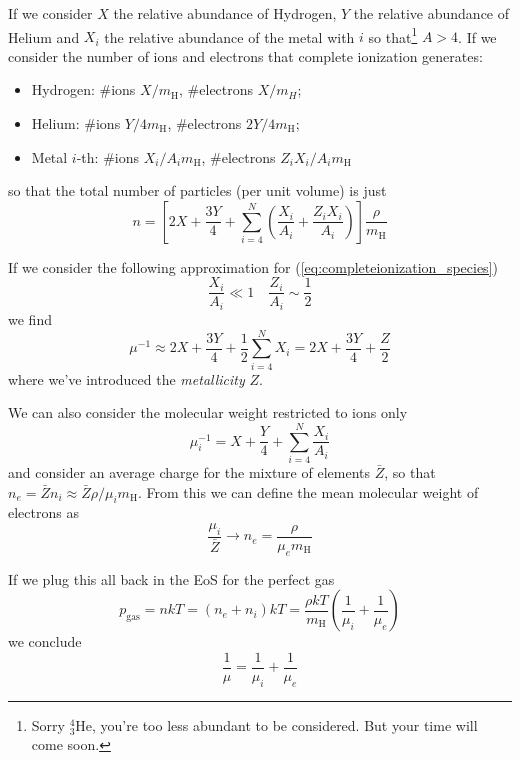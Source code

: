 \par If we consider $X$ the relative abundance of Hydrogen, $Y$ the relative abundance of Helium and $X_{i}$ the relative abundance of the metal with $i$ so that\footnote{Sorry $^{4}_{3}\text{He}$, you're too less abundant to be considered. But your time will come soon.} $A>4$. If we consider the number of ions and electrons that complete ionization generates:
\begin{itemize}
	\item Hydrogen: \#ions $X/m_{\text{H}}$, \#electrons $X/m_{H}$;
	\item Helium: \#ions $Y/4m_{\text{H}}$, \#electrons $2Y/4m_{\text{H}}$;
	\item Metal $i$-th: \#ions $X_{i}/A_{i}m_{\text{H}}$, \#electrons $Z_{i}X_{i}/A_{i}m_{\text{H}}$
\end{itemize}
so that the total number of particles (per unit volume) is just
\begin{equation}
	n = \left[2X+\frac{3Y}{4}+\sum_{i=4}^{N}\left(\frac{X_{i}}{A_{i}}+\frac{Z_{i}X_{i}}{A_{i}}\right)\right]\frac{\rho}{m_{\text{H}}}
	\label{eq:completeionization_species}
\end{equation}
\par If we consider the following approximation for (\ref{eq:completeionization_species})
\begin{equation*}
	\frac{X_{i}}{A_{i}}\ll 1 \quad \frac{Z_{i}}{A_{i}}\sim \frac{1}{2}
\end{equation*}
we find
\begin{equation}
	\mu^{-1} \approx 2X + \frac{3Y}{4} + \frac{1}{2} \sum_{i=4}^{N} X_{i} = 2X + \frac{3Y}{4} + \frac{Z}{2}
	\label{eq:molecularweight}
\end{equation}
where we've introduced the \emph{metallicity} $Z$.
\par We can also consider the molecular weight restricted to ions only
\begin{equation*}
	\mu_{i}^{-1} = X + \frac{Y}{4} +\sum_{i = 4}^{N}\frac{X_{i}}{A_{i}}
\end{equation*}
and consider an average charge for the mixture of elements $\bar{Z}$, so that $n_{e} = \bar{Z}n_{i} \approx \bar{Z}\rho/\mu_{i}m_{\text{H}}$. From this we can define the mean molecular weight of electrons as 
\begin{equation*}
	\frac{\mu_{i}}{\bar{Z}} \to n_{e} = \frac{\rho}{\mu_{e}m_{\text{H}}}
\end{equation*}
\par If we plug this all back in the EoS for the perfect gas 
\begin{equation*}
	p_{\text{gas}} = nkT = (n_{e}+n_{i})kT = \frac{\rho k T}{m_{\text{H}}}\left(\frac{1}{\mu_{i}}+\frac{1}{\mu_{e}}\right)
\end{equation*}
we conclude
\begin{equation}
	\boxed{
	\frac{1}{\mu} = \frac{1}{\mu_{i}}+\frac{1}{\mu_{e}}
	}
	\label{eq:mwcomposition}
\end{equation}

